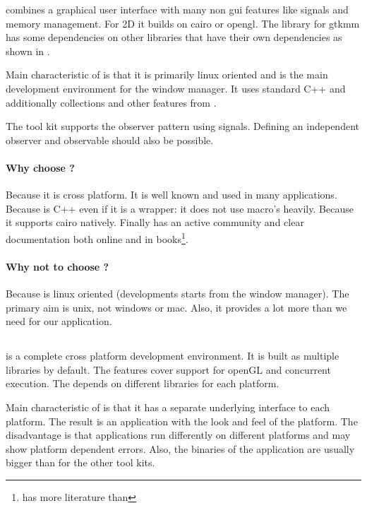  combines a graphical user interface with many non gui features like
signals and memory management. For 2D it builds on cairo or opengl. The library
for gtkmm has some dependencies on other libraries that have their own
dependencies as shown in \cite{gtkmm:gtk+-dep}.

Main characteristic of  is that it is primarily linux oriented and is
the main development environment for the  window manager. It uses
standard C++ and additionally collections and other features from .

The tool kit  supports the observer pattern using signals. Defining an
independent observer and observable should also be possible.

\paragraph{Why choose ?} Because it is cross platform. It is well
known and used in many applications. Because  is C++ even if it is a
wrapper: it does not use macro's heavily. Because it supports cairo natively.
Finally  has an active community and clear documentation both online
and in books\footnote{ has more literature than }.

\paragraph{Why not to choose ?} Because  is linux oriented
(developments starts from the  window manager). The primary aim is
unix, not windows or mac.  Also, it provides a lot more than we need for our
application.

\subsection{} 

 is a complete cross platform development environment. It is built
as multiple libraries by default. The features cover support for openGL and
concurrent execution. The  depends on different libraries for each
platform.

Main characteristic of  is that it has a separate underlying
interface to each platform. The result is an application with the look and feel
of the platform. The disadvantage is that applications run differently on
different platforms and may show platform dependent errors. Also, the binaries
of the application are usually bigger than for the other tool kits.

